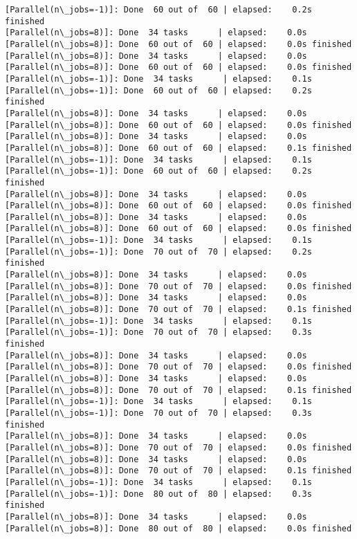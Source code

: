 \documentclass[11pt]{article}
\begin{document}
\begin{Verbatim}[commandchars=\\\{\}]
[Parallel(n\_jobs=-1)]: Done  60 out of  60 | elapsed:    0.2s finished
[Parallel(n\_jobs=8)]: Done  34 tasks      | elapsed:    0.0s
[Parallel(n\_jobs=8)]: Done  60 out of  60 | elapsed:    0.0s finished
[Parallel(n\_jobs=8)]: Done  34 tasks      | elapsed:    0.0s
[Parallel(n\_jobs=8)]: Done  60 out of  60 | elapsed:    0.0s finished
[Parallel(n\_jobs=-1)]: Done  34 tasks      | elapsed:    0.1s
[Parallel(n\_jobs=-1)]: Done  60 out of  60 | elapsed:    0.2s finished
[Parallel(n\_jobs=8)]: Done  34 tasks      | elapsed:    0.0s
[Parallel(n\_jobs=8)]: Done  60 out of  60 | elapsed:    0.0s finished
[Parallel(n\_jobs=8)]: Done  34 tasks      | elapsed:    0.0s
[Parallel(n\_jobs=8)]: Done  60 out of  60 | elapsed:    0.1s finished
[Parallel(n\_jobs=-1)]: Done  34 tasks      | elapsed:    0.1s
[Parallel(n\_jobs=-1)]: Done  60 out of  60 | elapsed:    0.2s finished
[Parallel(n\_jobs=8)]: Done  34 tasks      | elapsed:    0.0s
[Parallel(n\_jobs=8)]: Done  60 out of  60 | elapsed:    0.0s finished
[Parallel(n\_jobs=8)]: Done  34 tasks      | elapsed:    0.0s
[Parallel(n\_jobs=8)]: Done  60 out of  60 | elapsed:    0.0s finished
[Parallel(n\_jobs=-1)]: Done  34 tasks      | elapsed:    0.1s
[Parallel(n\_jobs=-1)]: Done  70 out of  70 | elapsed:    0.2s finished
[Parallel(n\_jobs=8)]: Done  34 tasks      | elapsed:    0.0s
[Parallel(n\_jobs=8)]: Done  70 out of  70 | elapsed:    0.0s finished
[Parallel(n\_jobs=8)]: Done  34 tasks      | elapsed:    0.0s
[Parallel(n\_jobs=8)]: Done  70 out of  70 | elapsed:    0.1s finished
[Parallel(n\_jobs=-1)]: Done  34 tasks      | elapsed:    0.1s
[Parallel(n\_jobs=-1)]: Done  70 out of  70 | elapsed:    0.3s finished
[Parallel(n\_jobs=8)]: Done  34 tasks      | elapsed:    0.0s
[Parallel(n\_jobs=8)]: Done  70 out of  70 | elapsed:    0.0s finished
[Parallel(n\_jobs=8)]: Done  34 tasks      | elapsed:    0.0s
[Parallel(n\_jobs=8)]: Done  70 out of  70 | elapsed:    0.1s finished
[Parallel(n\_jobs=-1)]: Done  34 tasks      | elapsed:    0.1s
[Parallel(n\_jobs=-1)]: Done  70 out of  70 | elapsed:    0.3s finished
[Parallel(n\_jobs=8)]: Done  34 tasks      | elapsed:    0.0s
[Parallel(n\_jobs=8)]: Done  70 out of  70 | elapsed:    0.0s finished
[Parallel(n\_jobs=8)]: Done  34 tasks      | elapsed:    0.0s
[Parallel(n\_jobs=8)]: Done  70 out of  70 | elapsed:    0.1s finished
[Parallel(n\_jobs=-1)]: Done  34 tasks      | elapsed:    0.1s
[Parallel(n\_jobs=-1)]: Done  80 out of  80 | elapsed:    0.3s finished
[Parallel(n\_jobs=8)]: Done  34 tasks      | elapsed:    0.0s
[Parallel(n\_jobs=8)]: Done  80 out of  80 | elapsed:    0.0s finished

\end{Verbatim}
\end{document}
